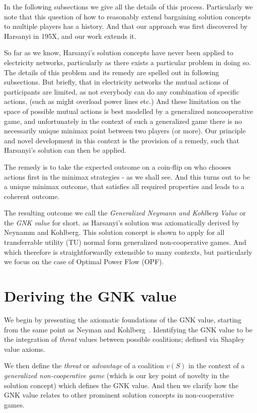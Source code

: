 In the following subsections we give all the details of this process. Particularly we note that this question of how to reasonably extend bargaining solution concepts to multiple players has a history.
And that our approach was first discovered by Harsanyi in 195X, and our work extends it.

So far as we know, Harsanyi's solution concepts have never been applied to electricity networks, particularly as there exists a particular problem in doing so.
The details of this problem and its remedy are spelled out in following subsections.
But briefly, that in electricity networks the mutual actions of participants are limited, as not everybody can do any combination of specific actions, (such as might overload power lines etc.)
And these limitation on the space of possible mutual actions is best modelled by a generalized noncooperative game, and unfortunately in the context of such a generalized game there is no necessarily unique minimax point between two players (or more).
Our principle and novel development in this context is the provision of a remedy, such that Harsanyi's solution can then be applied.

The remedy is to take the expected outcome on a coin-flip on who chooses actions first in the minimax strategies - as we shall see. And this turns out to be a unique minimax outcome, that satisfies all required properties and leads to a coherent outcome.

The resulting outcome we call the \textit{Generalized Neymann and Kohlberg Value} or the \textit{GNK value} for short.
as Harsanyi's solution was axiomatically derived by Neynamm and Kohlberg.
This solution concept is shown to apply for all transferrable utility (TU) normal form generalized non-cooperative games.
And which therefore is straightforwardly extensible to many contexts, but particularly we focus on the case of Optimal Power Flow (OPF).

\section{Deriving the GNK value}\label{the_value_def2}

We begin by presenting the axiomatic foundations of the GNK value, starting from the same point as Neyman and Kohlberg~\cite{value2}.
Identifying the GNK value to be the integration of \emph{threat} values between possible coalitions; defined via Shapley value axioms.

We then define the \emph{threat} or \emph{advantage} of a coalition $v(S)$ in the context of a \textit{generalized non-cooperative game} (which is our key point of novelty in the solution concept) which defines the GNK value.
And then we clarify how the GNK value relates to other prominent solution concepts in non-cooperative games.

